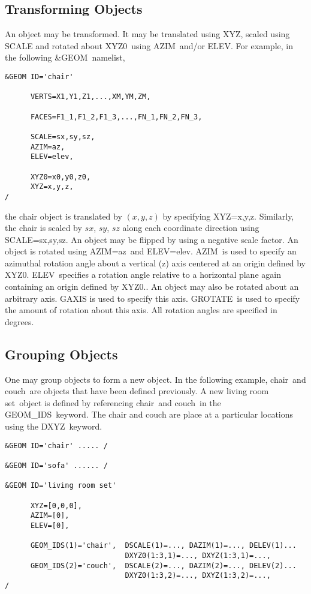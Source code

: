 \documentclass[12pt]{article}
\begin{document}
\subsection{Transforming Objects}
An object may be transformed.
It  may be translated using {\ct XYZ}, scaled using {\ct SCALE} and rotated about {\ct XYZ0}\ using {\ct AZIM}\ and/or {\ct ELEV}.
For example, in the following {\ct \&GEOM}\ namelist,

{\small
\begin{verbatim}
&GEOM ID='chair'

      VERTS=X1,Y1,Z1,...,XM,YM,ZM,

      FACES=F1_1,F1_2,F1_3,...,FN_1,FN_2,FN_3,

      SCALE=sx,sy,sz,
      AZIM=az,
      ELEV=elev,

      XYZ0=x0,y0,z0,
      XYZ=x,y,z,
/
\end{verbatim}
}

\noindent the chair object is translated by $(x,y,z)$ by specifying {\ct XYZ=x,y,z}.
Similarly, the chair is scaled by $sx$, $sy$, $sz$ along each coordinate direction using {\ct SCALE=sx,sy,sz}.
An object may be flipped by using a negative scale factor.
An object is rotated using {\ct AZIM=az}\ and {\ct ELEV=elev}.
{\ct AZIM}\ is used to specify an azimuthal rotation angle about a vertical (z) axis centered at an origin defined by {\ct XYZ0}.
{\ct ELEV}\ specifies a rotation angle relative to a horizontal plane again containing an origin defined by {\ct XYZ0}..
An object may also be rotated about an arbitrary axis.
{\ct GAXIS} is used to specify this axis.
{\ct GROTATE}\ is used to specify the amount of rotation about this axis.
All rotation angles are specified in degrees.

\subsection{Grouping Objects}
One may group objects to form a new object.  In the following example,
{\ct chair}\ and {\ct couch}\ are objects that have been defined previously.  A new {\ct living room set}\ object
is defined by referencing {\ct chair}\ and {\ct couch}\ in the {\ct GEOM\_IDS}\ keyword.  The chair and couch
are place at a particular locations using the {\ct DXYZ}\ keyword.

{\small
\begin{verbatim}
&GEOM ID='chair' ..... /

&GEOM ID='sofa' ...... /

&GEOM ID='living room set'

      XYZ=[0,0,0],
      AZIM=[0],
      ELEV=[0],

      GEOM_IDS(1)='chair',  DSCALE(1)=..., DAZIM(1)=..., DELEV(1)...
                            DXYZ0(1:3,1)=..., DXYZ(1:3,1)=...,
      GEOM_IDS(2)='couch',  DSCALE(2)=..., DAZIM(2)=..., DELEV(2)...
                            DXYZ0(1:3,2)=..., DXYZ(1:3,2)=...,
/
\end{verbatim}
}
\end{document}
